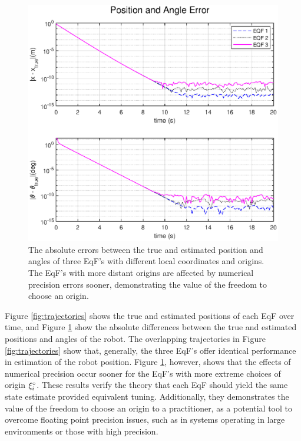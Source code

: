 \documentclass{article}
\newcommand{\figsize}{0.7}
\begin{document}
\begin{figure}[ht]
    \centering
    \includegraphics[width=\figsize\linewidth]{trial.eps}
    \caption{The absolute errors between the true and estimated position and angles of three EqF's with different local coordinates and origins.
    The EqF's with more distant origins are affected by numerical precision errors sooner, demonstrating the value of the freedom to choose an origin.}
    \label{fig:errors}
\end{figure}


Figure \ref{fig:trajectories} shows the true and estimated positions of each EqF over time, and Figure \ref{fig:errors} show the absolute differences between the true and estimated positions and angles of the robot.
The overlapping trajectories in Figure \ref{fig:trajectories} show that, generally, the three EqF's offer identical performance in estimation of the robot position.
Figure \ref{fig:errors}, however, shows that the effects of numerical precision occur sooner for the EqF's with more extreme choices of origin ${\xi}^\circ_i$.
These results verify the theory that each EqF should yield the same state estimate provided equivalent tuning.
Additionally, they demonstrates the value of the freedom to choose an origin to a practitioner, as a potential tool to overcome floating point precision issues, such as in systems operating in large environments or those with high precision.
\end{document}

